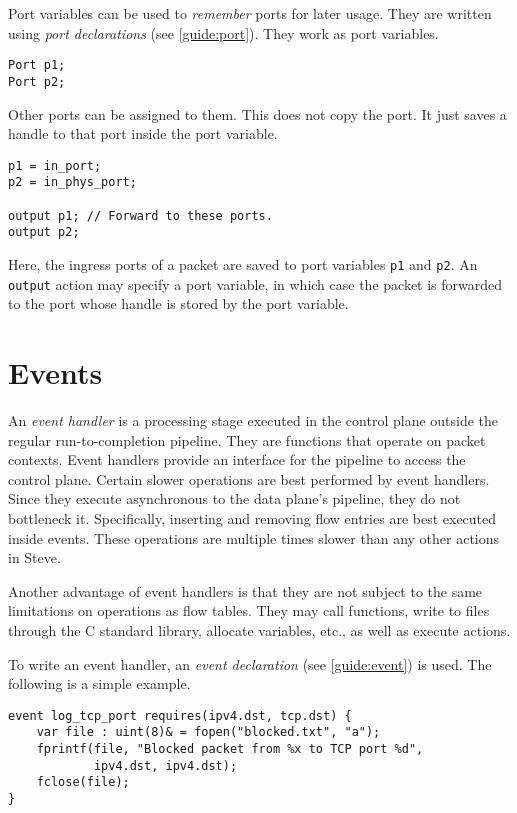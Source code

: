 Port variables can be used to \textit{remember} ports for later usage. They are
written using \textit{port declarations} (see \ref{guide:port}).
They work as port variables.

\begin{lstlisting}
Port p1;
Port p2;
\end{lstlisting}

Other ports can be assigned to them. This does not copy the port. It just saves
a handle to that port inside the port variable.

\begin{lstlisting}
p1 = in_port; 
p2 = in_phys_port;

output p1; // Forward to these ports.
output p2;
\end{lstlisting}

Here, the ingress ports of a packet are saved to port variables \texttt{p1} and \texttt{p2}. An \texttt{output} action may specify a port variable, in which case the packet is forwarded to the port whose handle is stored by the port variable.

\section{Events} \label{tut:event}

An \textit{event handler} is a processing stage executed in the control plane outside the regular
run-to-completion pipeline. They are
functions that operate on packet contexts. 
Event handlers provide an interface for the pipeline to access the control
plane. Certain slower operations
are best performed by event handlers. Since they execute asynchronous to the
data plane's pipeline, they do not bottleneck it.
Specifically, inserting and removing flow entries are best executed inside
events. These operations are multiple times slower
than any other actions in Steve.

Another advantage of event handlers is that they are not subject to the same
limitations on operations as flow tables. They may call functions,
write to files through the C standard library, allocate variables, etc., as
well as execute actions.

To write an event handler, an \textit{event declaration}
(see \ref{guide:event}) is used. The following is a simple example.

\begin{lstlisting}
event log_tcp_port requires(ipv4.dst, tcp.dst) {
	var file : uint(8)& = fopen("blocked.txt", "a");
	fprintf(file, "Blocked packet from %x to TCP port %d", 
			ipv4.dst, ipv4.dst);
	fclose(file);
}
\end{lstlisting}

